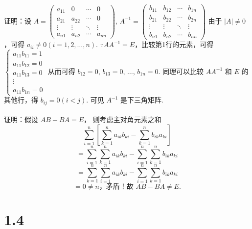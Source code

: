 	 \paragraph{} %
		 证明：设
		 $A = \begin{pmatrix}
				 a_{11} & 0      & \cdots & 0      \\
				 a_{21} & a_{22} & \cdots & 0      \\
				 \vdots & \vdots & \ddots & \vdots \\
				 a_{n1} & a_{n2} & \cdots & a_{nn}
			 \end{pmatrix}$,
		 $A^{-1} = \begin{pmatrix}
				 b_{11} & b_{12} & \cdots & b_{1n} \\
				 b_{21} & b_{22} & \cdots & b_{2n} \\
				 \vdots & \vdots & \ddots & \vdots \\
				 b_{n1} & b_{n2} & \cdots & b_{nn}
			 \end{pmatrix}$
		 由于 $|A| \neq 0$，可得 $a_{ii} \neq 0 (i=1,2,\ldots,n)$.
		 $\because AA^{-1}=E$，比较第1行的元素，可得
		 $\begin{cases}
				 a_{11}b_{11}=1 \\
				 a_{11}b_{12}=0 \\
				 a_{11}b_{13}=0 \\
				 \vdots         \\
				 a_{11}b_{1n}=0
			 \end{cases}$
		 从而可得 $b_{12}=0$, $b_{13}=0$, $\ldots$, $b_{1n}=0$.
		 同理可以比较 $AA^{-1}$ 和 $E$ 的其他行，得 $b_{ij}=0 (i<j)$.
		 可见 $A^{-1}$ 是下三角矩阵.


	 \paragraph{} %
		 证明：假设 $AB-BA=E$，
		 则考虑主对角元素之和
		 \[\sum_{i=1}^n \left[\sum_{k=1}^n a_{ik}b_{ki} - \sum_{k=1}^n b_{ik}a_{ki}\right]\]
		 \[= \sum_{i=1}^n \sum_{k=1}^n a_{ik}b_{ki} - \sum_{i=1}^n \sum_{k=1}^n b_{ik}a_{ki}\]
		 \[= \sum_{k=1}^n \sum_{i=1}^n a_{ik}b_{ki} - \sum_{i=1}^n \sum_{k=1}^n b_{ik}a_{ki}\]
		 \[= 0 \neq n\text{，矛盾！故 } AB-BA \neq E.\]

\section{1.4}


 \subsection{} %


